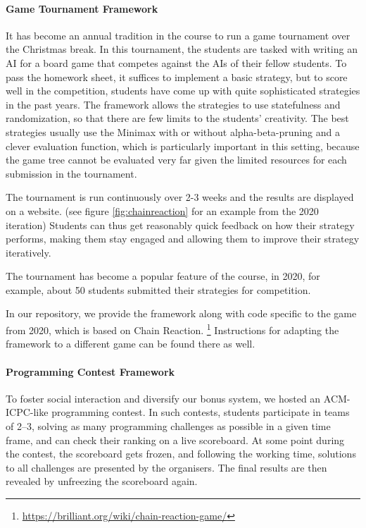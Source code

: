 \paragraph{Game Tournament Framework}
It has become an annual tradition in the course to run a game tournament over the Christmas break.
In this tournament, the students are tasked with writing an AI for a board game that competes against the AIs of their fellow students.
To pass the homework sheet, it suffices to implement a basic strategy, but to score well in the competition, students have come up with quite sophisticated strategies in the past years. The framework allows the strategies to use statefulness and randomization, so that there are few limits to the students' creativity.
The best strategies usually use the Minimax with or without alpha-beta-pruning and a clever evaluation function, which is particularly important in this setting, because the game tree cannot be evaluated very far given the limited resources for each submission in the tournament.

The tournament is run continuously over 2-3 weeks and the results are displayed on a website. (see figure \ref{fig:chainreaction} for an example from the 2020 iteration)
Students can thus get reasonably quick feedback on how their strategy performs, making them stay engaged and allowing them to improve their strategy iteratively.

The tournament has become a popular feature of the course, in 2020, for example, about 50 students submitted their strategies for competition.

In our repository, we provide the framework along with code specific to the game from 2020, which is based on Chain Reaction. \footnote{\url{ https://brilliant.org/wiki/chain-reaction-game/}} Instructions for adapting the framework to a different game can be found there as well.

\paragraph{Programming Contest Framework}\label{sec:contest}
To foster social interaction and diversify our bonus system,
we hosted an ACM-ICPC-like programming contest.
In such contests, students
participate in teams of 2--3,
solving as many programming challenges as possible in a given time frame,
and can check their ranking on a live scoreboard.
At some point during the contest,
the scoreboard gets frozen,
and following the working time,
solutions to all challenges are presented by the organisers.
The final results are then revealed by unfreezing the scoreboard again.

